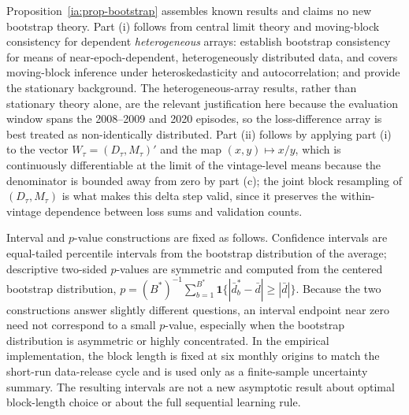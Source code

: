 \documentclass[a4paper,12pt]{article}
\newcommand{\1}{\mathbf{1}}
\begin{document}
Proposition~\ref{ia:prop-bootstrap} assembles known results and claims no new bootstrap theory. Part (i) follows from central limit theory and moving-block consistency for dependent \emph{heterogeneous} arrays: \citet{GoncalvesWhite2002} establish bootstrap consistency for means of near-epoch-dependent, heterogeneously distributed data, and \citet{Fitzenberger1998} covers moving-block inference under heteroskedasticity and autocorrelation; \citet{Kunsch1989} and \citet{Lahiri2003} provide the stationary background. The heterogeneous-array results, rather than stationary theory alone, are the relevant justification here because the evaluation window spans the 2008--2009 and 2020 episodes, so the loss-difference array is best treated as non-identically distributed. Part (ii) follows by applying part (i) to the vector $W_\tau=(D_\tau,M_\tau)'$ and the map $(x,y)\mapsto x/y$, which is continuously differentiable at the limit of the vintage-level means because the denominator is bounded away from zero by part (c); the joint block resampling of $(D_\tau,M_\tau)$ is what makes this delta step valid, since it preserves the within-vintage dependence between loss sums and validation counts.

Interval and $p$-value constructions are fixed as follows. Confidence intervals are equal-tailed percentile intervals from the bootstrap distribution of the average; descriptive two-sided $p$-values are symmetric and computed from the centered bootstrap distribution, $p=(B^\ast)^{-1}\sum_{b=1}^{B^\ast}\1\{|\bar d^\ast_b-\bar d|\ge|\bar d|\}$. Because the two constructions answer slightly different questions, an interval endpoint near zero need not correspond to a small $p$-value, especially when the bootstrap distribution is asymmetric or highly concentrated. In the empirical implementation, the block length is fixed at six monthly origins to match the short-run data-release cycle and is used only as a finite-sample uncertainty summary. The resulting intervals are not a new asymptotic result about optimal block-length choice or about the full sequential learning rule.
\end{document}
